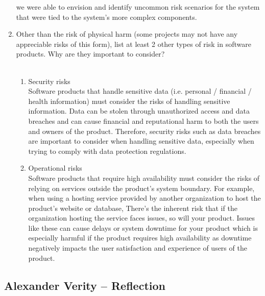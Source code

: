\documentclass{article}
\begin{document}
\begin{enumerate}
  we were able to envision and identify uncommon risk scenarios for the system 
  that were tied to the system’s more complex components.
  \item Other than the risk of physical harm (some projects may not have any
  appreciable risks of this form), list at least 2 other types of risk in
  software products. Why are they important to consider?\\\\
  \begin{enumerate}
    \item Security risks\\
    Software products that handle sensitive data (i.e. personal / financial / 
    health information) must consider the risks of handling sensitive information. 
    Data can be stolen through unauthorized access and data breaches and can cause 
    financial and reputational harm to both the users and owners of the product. 
    Therefore, security risks such as data breaches are important to consider when 
    handling sensitive data, especially when trying to comply with data protection 
    regulations.
    \item Operational risks\\
    Software products that require high availability must consider the risks of 
    relying on services outside the product’s system boundary. For example, when 
    using a hosting service provided by another organization to host the product’s 
    website or database, There’s the inherent risk that if the organization hosting 
    the service faces issues, so will your product. Issues like these can cause 
    delays or system downtime for your product which is especially harmful if the 
    product requires high availability as downtime negatively impacts the user 
    satisfaction and experience of users of the product.
  \end{enumerate}

\end{enumerate}

\subsection*{Alexander Verity -- Reflection}
\end{document}
